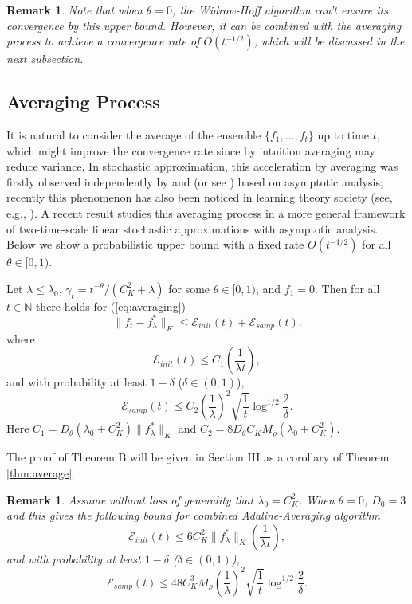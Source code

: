 \documentclass[twoside,twocolumn,journal]{IEEEtran}
\newtheorem{rem}[thm]{Remark}
\newenvironment{mainthm}[1][Main Theorem]{\medskip \noindent {\bf #1.}\begin{em}}{\end{em}\medskip}
\def\N{{\mathbb N}}
\def\Err{{\mathscr E}}
\begin{document}
\medskip

\begin{rem}
Note that when $\theta=0$, the \emph{Widrow-Hoff} algorithm \cite{WidHof60} can't ensure its convergence by this upper bound.
However, it can be combined with the averaging process to achieve a convergence rate of $O(t^{-1/2})$,
which will be discussed in the next subsection.
\end{rem}

\subsection{Averaging Process}
It is natural to consider the average of the ensemble
$\{f_1,\ldots,f_t\}$ up to time $t$, which might improve the
convergence rate since by intuition averaging may reduce variance.
In stochastic approximation, this acceleration by averaging was
firstly observed independently by \cite{Ruppert88} and
\cite{Polyak90} (or see \cite{PolJud92}) based on
asymptotic analysis; recently this phenomenon has also been
noticed in learning theory society (see, e.g.,
\cite{CesConGen04}). A recent result \cite{KonTsi04} studies
this averaging process in a more general framework of
two-time-scale linear stochastic approximations with asymptotic analysis. Below we show
a probabilistic upper bound with a fixed rate $O(t^{-1/2})$ for all $\theta\in [0,1)$.


%
%

\begin{mainthm}[Theorem B]
Let $\lambda\leq \lambda_0$, $\gamma_t = t^{-\theta}/(C^2_K + \lambda)$ for some $\theta\in [0,1)$, and $f_1=0$.
Then for all $t\in \N$ there holds for (\ref{eq:averaging})
\[ \| \bar{f}_t - f^\ast_\lambda \|_K \leq \Err_{init}(t) + \Err_{samp}(t). \]
where
\[ \Err_{init}(t)\leq  C_1 \left( \frac{1}{\lambda t} \right), \]
and with probability at least $1-\delta$ ($\delta\in (0,1)$),
\[ \Err_{samp}(t) \leq C_2 \left(\frac{1}{\lambda} \right)^2 \sqrt{\frac{1}{t}} \log^{1/2}\frac{2}{\delta}. \]
Here $C_1=D_\theta(\lambda_0+C^2_K) \|f^\ast_\lambda\|_K$ and $C_2=8 D_\theta C_K M_\rho(\lambda_0+C^2_K)$.
\end{mainthm}

The proof of Theorem B will be given in Section III as a corollary of Theorem \ref{thm:average}.

\medskip

\begin{rem} Assume without loss of generality that $\lambda_0=C^2_K$. When $\theta=0$, $D_0=3$ and this gives the following bound
for combined \emph{Adaline-Averaging} algorithm
\[ \Err_{init}(t)\leq  6C^2_K \|f^\ast_\lambda\|_K \left( \frac{1}{\lambda t} \right),\]
and with probability at least $1-\delta$ ($\delta\in (0,1)$),
\[ \Err_{samp}(t) \leq 48 C^3_K M_\rho \left(\frac{1}{\lambda} \right)^2 \sqrt{\frac{1}{t}} \log^{1/2}\frac{2}{\delta}. \]
\end{rem}
\end{document}
